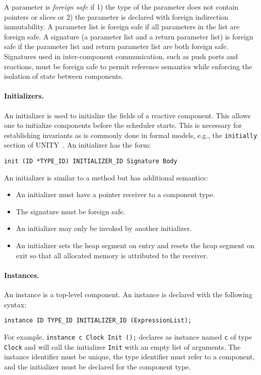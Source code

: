 A parameter is \emph{foreign safe} if 1) the type of the parameter does not contain pointers or slices or 2) the parameter is declared with foreign indirection immutability.
A parameter list is foreign safe if all parameters in the list are foreign safe.
A signature (a parameter list and a return parameter list) is foreign safe if the parameter list and return parameter list are both foreign safe.
Signatures used in inter-component communication, such as push ports and reactions, must be foreign safe to permit reference semantics while enforcing the isolation of state between components.

\paragraph{Initializers.}
An initializer is used to initialize the fields of a reactive component.
This allows one to initialize components before the scheduler starts.
This is necessary for establishing invariants as is commonly done in formal models, e.g., the \verb+initially+ section of UNITY~\cite{chandy1989parallel}.
An initializer has the form:
\begin{verbatim}
init (ID *TYPE_ID) INITIALIZER_ID Signature Body
\end{verbatim}
An initializer is similar to a method but has additional semantics:
\begin{itemize}
\item An initializer must have a pointer receiver to a component type.
\item The signature must be foreign safe.
\item An initializer may only be invoked by another initializer.
\item An initializer sets the heap segment on entry and resets the heap segment on exit so that all allocated memory is attributed to the receiver.
\end{itemize}

\paragraph{Instances.}
An instance is a top-level component.
An instance is declared with the following syntax:
\begin{verbatim}
instance ID TYPE_ID INITIALIZER_ID (ExpressionList);
\end{verbatim}
For example, \verb+instance c Clock Init ();+ declares as instance named \verb+c+ of type \verb+Clock+ and will call the initializer \verb+Init+ with an empty list of arguments.
The instance identifier must be unique, the type identifier must refer to a component, and the initializer must be declared for the component type.

